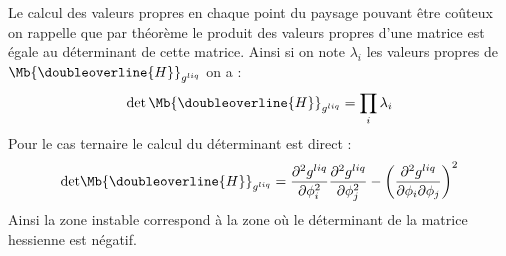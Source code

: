 Le calcul des valeurs propres en chaque point du paysage pouvant être coûteux on rappelle que par théorème le produit des valeurs propres d'une matrice est égale au déterminant de cette matrice. Ainsi si on note $\lambda_i$ les valeurs propres de $\Mb{\doubleoverline{H}}_{g^{liq}}$ on a :
\begin{equation}
	\det{\Mb{\doubleoverline{H}}_{g^{liq}}} = \prod_i \lambda_i
\end{equation}
Pour le cas ternaire le calcul du déterminant est direct :
\begin{equation}
	\text{det}  \Mb{\doubleoverline{H}}_{g^{liq}}   =  \frac{\partial^2 g^{liq}}{\partial \phi_i^2}
	\frac{\partial^2 g^{liq}}{\partial \phi_j^2}-\left(\frac{\partial^2 g^{liq} }{\partial \phi_i \partial \phi_j} \right)^2
\end{equation}
Ainsi la zone instable correspond à la zone où le déterminant de la matrice hessienne est négatif.

